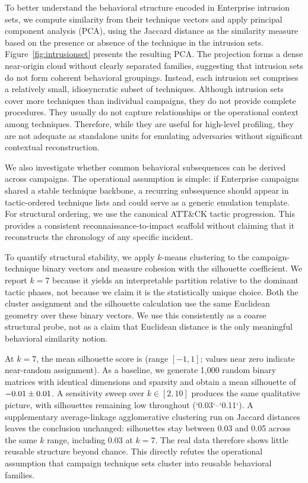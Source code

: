 \documentclass[sigconf]{acmart}
\newcommand{\attack}{ATT\&CK\xspace}
\begin{document}
To better understand the behavioral structure encoded in Enterprise intrusion sets, we compute similarity from their technique vectors and apply principal component analysis (PCA), using the Jaccard distance as the similarity measure based on the presence or absence of the technique in the intrusion sets. Figure~\ref{fig:intrusionset} presents the resulting PCA. The projection forms a dense near-origin cloud without clearly separated families, suggesting that intrusion sets do not form coherent behavioral groupings. Instead, each intrusion set comprises a relatively small, idiosyncratic subset of techniques. Although intrusion sets cover more techniques than individual campaigns, they do not provide complete procedures. They usually do not capture relationships or the operational context among techniques. Therefore, while they are useful for high-level profiling, they are not adequate as standalone units for emulating adversaries without significant contextual reconstruction.

We also investigate whether common behavioral subsequences can be derived across campaigns. The operational assumption is simple: if Enterprise campaigns shared a stable technique backbone, a recurring subsequence should appear in tactic-ordered technique lists and could serve as a generic emulation template. For structural ordering, we use the canonical \attack{} tactic progression. This provides a consistent reconnaissance-to-impact scaffold without claiming that it reconstructs the chronology of any specific incident.

To quantify structural stability, we apply $k$-means clustering to the campaign-technique binary vectors and measure cohesion with the silhouette coefficient. We report $k=7$ because it yields an interpretable partition relative to the dominant tactic phases, not because we claim it is the statistically unique choice. Both the cluster assignment and the silhouette calculation use the same Euclidean geometry over these binary vectors. We use this consistently as a coarse structural probe, not as a claim that Euclidean distance is the only meaningful behavioral similarity notion.

At $k=7$, the mean silhouette score is \silhouetteScore{} (range $[-1, 1]$; values near zero indicate near-random assignment). As a baseline, we generate 1{,}000 random binary matrices with identical dimensions and sparsity and obtain a mean silhouette of $-0.01{} \pm 0.01{}$. A sensitivity sweep over $k \in [2,10]$ produces the same qualitative picture, with silhouettes remaining low throughout (`0.03`--`0.11`). A supplementary average-linkage agglomerative clustering run on Jaccard distances leaves the conclusion unchanged: silhouettes stay between 0.03 and 0.05 across the same $k$ range, including 0.03 at $k=7$. The real data therefore shows little reusable structure beyond chance. This directly refutes the operational assumption that campaign technique sets cluster into reusable behavioral families.
\end{document}
